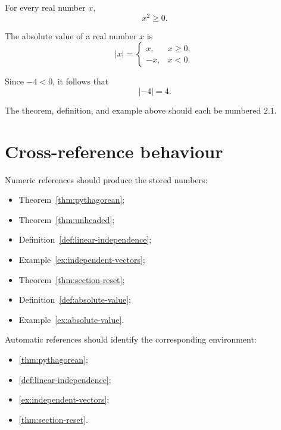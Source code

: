 \documentclass{studentnotes}
\begin{document}
\begin{theorem}
    \label{thm:section-reset}
    For every real number \(x\),
    \[
        x^2\geq 0.
    \]
\end{theorem}

\begin{definition}
    \label{def:absolute-value}
    The absolute value of a real number \(x\) is
    \[
        |x|=
        \begin{cases}
            x,  & x\geq 0,\\
            -x, & x<0.
        \end{cases}
    \]
\end{definition}

\begin{example}
    \label{ex:absolute-value}
    Since \(-4<0\), it follows that
    \[
        |-4|=4.
    \]
\end{example}

The theorem, definition, and example above should each be numbered
\(2.1\).

\section{Cross-reference behaviour}

Numeric references should produce the stored numbers:

\begin{itemize}
    \item Theorem~\ref{thm:pythagorean};
    \item Theorem~\ref{thm:unheaded};
    \item Definition~\ref{def:linear-independence};
    \item Example~\ref{ex:independent-vectors};
    \item Theorem~\ref{thm:section-reset};
    \item Definition~\ref{def:absolute-value};
    \item Example~\ref{ex:absolute-value}.
\end{itemize}

Automatic references should identify the corresponding environment:

\begin{itemize}
    \item \autoref{thm:pythagorean};
    \item \autoref{def:linear-independence};
    \item \autoref{ex:independent-vectors};
    \item \autoref{thm:section-reset}.
\end{itemize}
\end{document}
